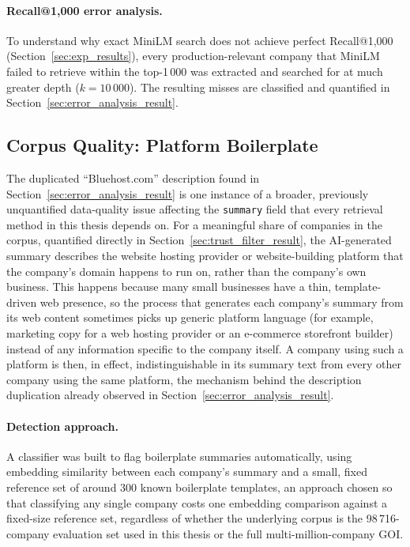 \documentclass[a4paper,oneside,bibliography=totoc]{scrbook}
\begin{document}
\paragraph{Recall@1{,}000 error analysis.}
\label{sec:error_analysis}

To understand why exact MiniLM search does not achieve perfect Recall@1{,}000 (Section~\ref{sec:exp_results}), every production-relevant company that MiniLM failed to retrieve within the top-1\,000 was extracted and searched for at much greater depth ($k=10\,000$). The resulting misses are classified and quantified in Section~\ref{sec:error_analysis_result}.

\subsection{Corpus Quality: Platform Boilerplate}
\label{sec:trust_filter}

The duplicated ``Bluehost.com'' description found in Section~\ref{sec:error_analysis_result} is one instance of a broader, previously unquantified data-quality issue affecting the \texttt{summary} field that every retrieval method in this thesis depends on. For a meaningful share of companies in the corpus, quantified directly in Section~\ref{sec:trust_filter_result}, the AI-generated summary describes the website hosting provider or website-building platform that the company's domain happens to run on, rather than the company's own business. This happens because many small businesses have a thin, template-driven web presence, so the process that generates each company's summary from its web content sometimes picks up generic platform language (for example, marketing copy for a web hosting provider or an e-commerce storefront builder) instead of any information specific to the company itself. A company using such a platform is then, in effect, indistinguishable in its summary text from every other company using the same platform, the mechanism behind the description duplication already observed in Section~\ref{sec:error_analysis_result}.

\paragraph{Detection approach.} A classifier was built to flag boilerplate summaries automatically, using embedding similarity between each company's summary and a small, fixed reference set of around 300 known boilerplate templates, an approach chosen so that classifying any single company costs one embedding comparison against a fixed-size reference set, regardless of whether the underlying corpus is the 98\,716-company evaluation set used in this thesis or the full multi-million-company GOI.
\end{document}
